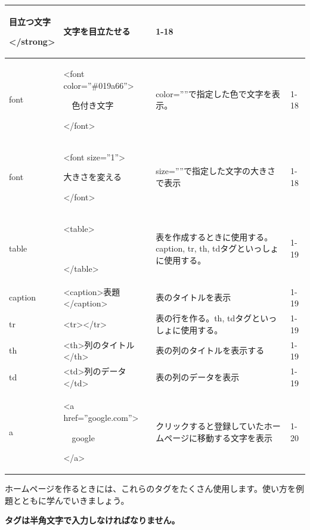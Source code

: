 \documentclass[a4paper,12pt]{jarticle}
\begin{document}
{\begin{center}
\begin{supertabular}{|m{2.171cm}|m{4.1060004cm}|m{7.8930006cm}|m{2.037cm}|}
      目立つ文字

      {\textless}/strong{\textgreater} &
      文字を目立たせる &
      1-18\\\hline
      font  &
      {\textless}font color=”\#019a66”{\textgreater}

      \ \ 色付き文字

      {\textless}/font{\textgreater} &
      color=””で指定した色で文字を表示。 &
      1-18\\\hline
      font &
      {\textless}font size=”1”{\textgreater}

      大きさを変える

      {\textless}/font{\textgreater} &
      size=””で指定した文字の大きさで表示 &
      1-18\\\hline
      table &
      {\textless}table{\textgreater}

      ~

      {\textless}/table{\textgreater} &
      表を作成するときに使用する。caption, tr, th,
      tdタグといっしょに使用する。 &
      1-19\\\hline
      caption &
      {\textless}caption{\textgreater}表題{\textless}/caption{\textgreater} &
      表のタイトルを表示 &
      1-19\\\hline
      tr &
      {\textless}tr{\textgreater}{\textless}/tr{\textgreater} &
      表の行を作る。th,
      tdタグといっしょに使用する。 &
      1-19\\\hline
      th &
      {\textless}th{\textgreater}列のタイトル{\textless}/th{\textgreater} &
      表の列のタイトルを表示する &
      1-19\\\hline
      td &
      {\textless}td{\textgreater}列のデータ{\textless}/td{\textgreater} &
      表の列のデータを表示 &
      1-19\\\hline
      a &
      {\textless}a href=”google.com”{\textgreater}

      \ \ google

        {\textless}/a{\textgreater} &
      クリックすると登録していたホームページに移動する文字を表示
      &
      1-20\\\hline
    \end{supertabular}
  \end{center}
}

\bigskip
ホームページを作るときには、これらのタグをたくさん使用します。使い方を例題とともに学んでいきましょう。


\clearpage


{\centering\bfseries
  タグは半角文字で入力しなければなりません。
  \par}
\end{document}
